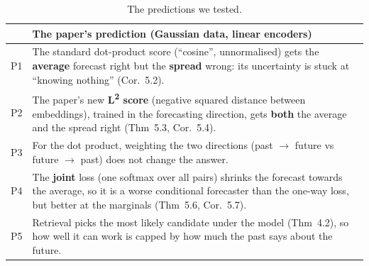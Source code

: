 \documentclass[11pt]{article}
\newcommand{\Ltwo}{L\textsuperscript{2}}
\begin{document}
\begin{table}[h]
\centering
\small
\begin{tabularx}{\textwidth}{@{}lL@{}}
\toprule
& The paper's prediction (Gaussian data, linear encoders) \\
\midrule
P1 & The standard dot-product score (``cosine'', unnormalised) gets the \textbf{average}
     forecast right but the \textbf{spread} wrong: its uncertainty is stuck at ``knowing
     nothing'' (Cor.~5.2). \\
P2 & The paper's new \textbf{\Ltwo{} score} (negative squared distance between embeddings),
     trained in the forecasting direction, gets \textbf{both} the average and the spread
     right (Thm~5.3, Cor.~5.4). \\
P3 & For the dot product, weighting the two directions (past $\to$ future vs
     future $\to$ past) does not change the answer. \\
P4 & The \textbf{joint} loss (one softmax over all pairs) shrinks the forecast towards the
     average, so it is a worse conditional forecaster than the one-way loss, but better at
     the marginals (Thm~5.6, Cor.~5.7). \\
P5 & Retrieval picks the most likely candidate under the model (Thm~4.2), so how well it
     can work is capped by how much the past says about the future. \\
\bottomrule
\end{tabularx}
\caption{The predictions we tested.}
\label{tab:predictions}
\end{table}
\end{document}
